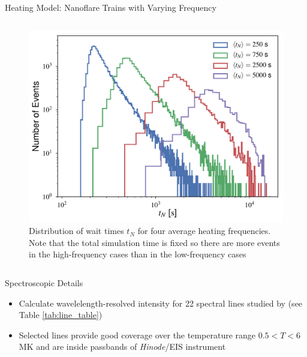 \documentclass[final]{beamer}
\begin{document}
\begin{frame}
\begin{columns}[T]
\begin{column}{0.49\linewidth}
\begin{block}{Heating Model: Nanoflare Trains with Varying Frequency}
\begin{columns}[T]
\begin{column}{0.49\columnwidth}
\begin{figure}
        \includegraphics[width=\columnwidth]{figures/wait_time_distributions.pdf}
        \caption{Distribution of wait times $t_N$ for four average heating frequencies. Note that the total simulation time is fixed so there are more events in the high-frequency cases than in the low-frequency cases} 
        \label{fig:wait_times}
        \end{figure}
      \end{column}
      \end{columns}
    \end{block}
    \begin{block}{Spectroscopic Details}
      \begin{itemize}
        \item Calculate wavelelength-resolved intensity for 22 spectral lines studied by \citet{warren_systematic_2012} (see Table \ref{tab:line_table})
        \item Selected lines provide good coverage over the temperature range $0.5<T<6$ MK and are inside passbands of \textit{Hinode}/EIS instrument
      \end{itemize}
      \begin{columns}[T]
        \begin{column}{0.49\columnwidth}
          \begin{figure}

\end{figure}
\end{column}
\end{columns}
\end{block}
\end{column}
\end{columns}
\end{frame}
\end{document}

